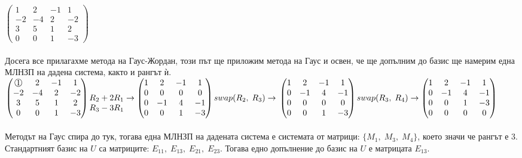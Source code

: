 \documentclass[12pt]{article}
\newcommand*{\mcirc}[1]{\text{\raisebox{.5pt}{\textcircled{\raisebox{-.9pt} {#1}}}}}
\begin{document}
$\begin{pmatrix}
     1 &  2 & -1 &  1 \\
    -2 & -4 &  2 & -2 \\
     3 &  5 &  1 &  2 \\
     0 &  0 &  1 & -3 
\end{pmatrix}$ \\\\

Досега все прилагахме метода на Гаус-Жордан, този път ще приложим метода на Гаус и
освен, че ще допълним до базис ще намерим една МЛНЗП на дадена система, както и рангът ѝ. \\

$\begin{pmatrix}
    \mcirc{1} &  2 & -1 &  1 \\
   -2 & -4 &  2 & -2 \\
    3 &  5 &  1 &  2 \\
    0 &  0 &  1 & -3 
\end{pmatrix} \begin{matrix}
    \\
    R_2 + 2R_1 \\
    R_3 - 3R_1
    \\
\end{matrix} \to \begin{pmatrix}
    1 &  2 & -1 &  1 \\
    0 &  0 &  0 &  0 \\
    0 & -1 &  4 & -1 \\
    0 &  0 &  1 & -3 
\end{pmatrix} swap(R_2, \; R_3) \to \\\\\\
\begin{pmatrix}
    1 &  2 & -1 &  1 \\
    0 & -1 &  4 & -1 \\
    0 &  0 &  0 &  0 \\
    0 &  0 &  1 & -3 
\end{pmatrix} swap(R_3, \; R_4) \to \begin{pmatrix}
    1 &  2 & -1 &  1 \\
    0 & -1 &  4 & -1 \\
    0 &  0 &  1 & -3 \\
    0 &  0 &  0 &  0
\end{pmatrix}$ \\\\

Методът на Гаус спира до тук, тогава една МЛНЗП на дадената система е системата от матрици:
$\{M_1, \; M_3, \; M_4\}$, което значи че рангът е $3$. Стандартният базис на $U$ са матриците:
$E_{11}, \; E_{13}, \; E_{21}, \; E_{23}$. Тогава едно допълнение до базис на $U$ е матрицата $E_{13}$. \\
\end{document}
